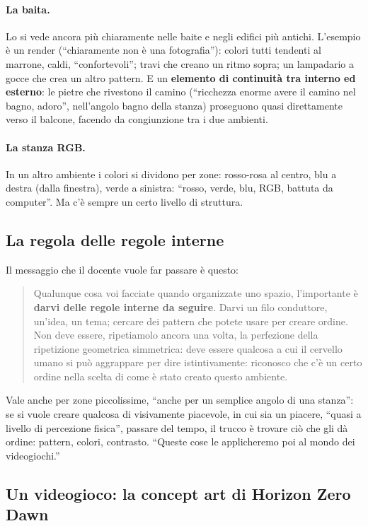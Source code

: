 \paragraph{La baita.} Lo si vede ancora più chiaramente nelle baite e negli edifici più
antichi. L'esempio è un render (``chiaramente non è una fotografia''): colori tutti
tendenti al marrone, caldi, ``confortevoli''; travi che creano un ritmo sopra; un
lampadario a gocce che crea un altro pattern. E un \textbf{elemento di continuità tra
interno ed esterno}: le pietre che rivestono il camino (``ricchezza enorme avere il camino
nel bagno, adoro'', nell'angolo bagno della stanza) proseguono quasi direttamente verso il
balcone, facendo da congiunzione tra i due ambienti.

\paragraph{La stanza RGB.} In un altro ambiente i colori si dividono per zone: rosso-rosa
al centro, blu a destra (dalla finestra), verde a sinistra: ``rosso, verde, blu, RGB,
battuta da computer''. Ma c'è sempre un certo livello di struttura.

\subsection{La regola delle regole interne}

Il messaggio che il docente vuole far passare è questo:
\begin{quote}
Qualunque cosa voi facciate quando organizzate uno spazio, l'importante è \textbf{darvi
delle regole interne da seguire}. Darvi un filo conduttore, un'idea, un tema; cercare dei
pattern che potete usare per creare ordine. Non deve essere, ripetiamolo ancora una volta,
la perfezione della ripetizione geometrica simmetrica: deve essere qualcosa a cui il
cervello umano si può aggrappare per dire istintivamente: riconosco che c'è un certo ordine
nella scelta di come è stato creato questo ambiente.
\end{quote}
Vale anche per zone piccolissime, ``anche per un semplice angolo di una stanza'': se si
vuole creare qualcosa di visivamente piacevole, in cui sia un piacere, ``quasi a livello di
percezione fisica'', passare del tempo, il trucco è trovare ciò che gli dà ordine: pattern,
colori, contrasto. ``Queste cose le applicheremo poi al mondo dei videogiochi.''

\subsection{Un videogioco: la concept art di Horizon Zero Dawn}

